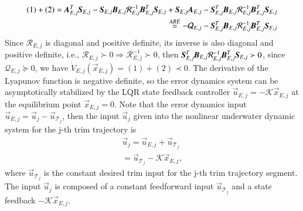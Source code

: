 \begin{align}
(1)+(2)=\emph{\textbf{A}}_{E,j}^{T}\emph{\textbf{S}}_{E,j}
-\emph{\textbf{S}}_{E,j}\emph{\textbf{B}}_{E,j}\mathcal{R}^{-1}_{E,j}
\emph{\textbf{B}}^{T}_{E,j}\emph{\textbf{S}}_{E,j}+
\emph{\textbf{S}}_{E,j}\emph{\textbf{A}}_{E,j}-\emph{\textbf{S}}_{E,j}^{T}
\emph{\textbf{B}}_{E,j}\mathcal{R}^{-1}_{E,j}
\emph{\textbf{B}}^{T}_{E,j}\emph{\textbf{S}}_{E,j} \nonumber \\
\overset{ARE}{=}
-\mathcal{Q}_{E,j}-\emph{\textbf{S}}_{E,j}^{T}\emph{\textbf{B}}_{E,j}
\mathcal{R}^{-1}_{E,j}
\emph{\textbf{B}}^{T}_{E,j}\emph{\textbf{S}}_{E,j}
\end{align}
Since $\mathcal{R}_{E,j}$ is diagonal and positive definite, its inverse is also diagonal and positive definite, i.e., $\mathcal{R}_{E,j}\succ 0\Rightarrow \mathcal{R}_{E,j}^{-1} \succ 0$, then $\emph{\textbf{S}}_{E,j}^{T}\emph{\textbf{B}}_{E,j}
\mathcal{R}^{-1}_{E,j}
\emph{\textbf{B}}^{T}_{E,j}\emph{\textbf{S}}_{E,j} \succ 0$, since $\mathcal{Q}_{E,j} \succeq 0$, we have $\dot{V}_{E,j}(\vec{x}_{E,j})=(1)+(2) \prec 0$. The derivative of the Lyapunov function is negative definite, so the error dynamics system can be asymptotically stabilized by the LQR state feedback controller $\vec{u}_{E,j}=-\mathcal{K}\vec{x}_{E,j}$ at the equilibrium point $\vec{x}_{E,j}=0$. Note that the error dynamics input $\vec{u}_{E,j}=\vec{u}_{j}-\vec{u}_{\mathcal{T}_{j}}$, then the input $\vec{u}_{j}$ given into the nonlinear underwater dynamic system for the j-th trim trajectory is 
\begin{align}
\vec{u}_{j}=\vec{u}_{E,j}+\vec{u}_{\mathcal{T}_{j}} \nonumber \\
=\vec{u}_{\mathcal{T}_{j}}-\mathcal{K}\vec{x}_{E,j},
\end{align} 
where $\vec{u}_{\mathcal{T}_{j}}$ is the constant desired trim input for the j-th trim trajectory segment. The input $\vec{u}_{j}$ is composed of a constant feedforward input $\vec{u}_{\mathcal{T}_{j}}$ and a state feedback $-\mathcal{K}\vec{x}_{E,j}$.

